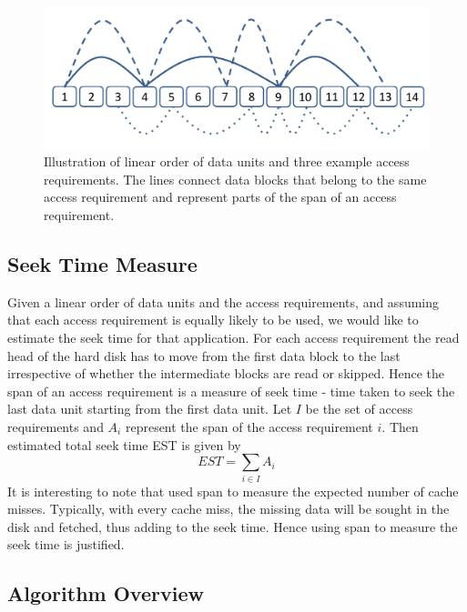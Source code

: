 \\
\begin{figure}[ht]
\centering
\includegraphics[width=\columnwidth]{AccessReqsFigure.pdf}
\caption{Illustration of linear order of data units and three example access requirements.
The lines connect data blocks that belong to the same access requirement
and represent parts of the span of an access requirement.}
\label{singleAR}
\end{figure}

\subsection{Seek Time Measure}
Given a linear order of data units and the access requirements, and assuming that each access requirement
is equally likely to be used, we would like to estimate the seek time for that application.
For each access requirement the read head of the hard disk has to move from the first data block to the last
irrespective of whether the intermediate blocks are read or skipped. Hence the span of an access requirement
is a measure of seek time - time taken to seek the last data unit starting from the first data unit.
Let $I$ be the set of access requirements and $A_i$ represent the span of the access requirement $i$.
Then estimated total seek time EST is given by 
\[
EST = \sum_{i \in I}{A_i}
\]
It is interesting to note that \cite{cacheobliviouslayout}
used span to measure the expected number of cache misses.
Typically, with every cache miss, the missing data will be sought in the disk and fetched,
thus adding to the seek time. Hence using span to measure the seek time is justified.


\subsection{Algorithm Overview}

